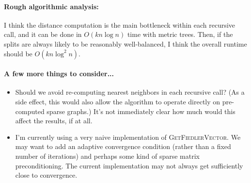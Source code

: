 \documentclass[11pt]{article}
\begin{document}

\clearpage
\paragraph{Rough algorithmic analysis:}
I think the distance computation is the main bottleneck within each recursive call, and it can be done in $O(k n \log n)$ time with metric trees.
Then, if the splits are always likely to be reasonably well-balanced, I think the overall runtime should be $O(k n \log^2 n)$.

\paragraph{A few more things to consider...}
\begin{itemize}
\item Should we avoid re-computing nearest neighbors in each recursive call?
(As a side effect, this would also allow the algorithm to operate directly on pre-computed sparse graphs.)
It's not immediately clear how much would this affect the results, if at all.
\item I'm currently using a very naive implementation of \textsc{GetFiedlerVector}.
We may want to add an adaptive convergence condition (rather than a fixed number of iterations) and perhaps some kind of sparse matrix preconditioning.
The current implementation may not always get sufficiently close to convergence.
\end{itemize}
\end{document}
